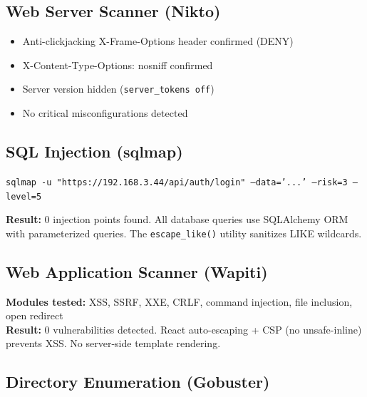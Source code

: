 \documentclass[11pt,a4paper]{article}
\begin{document}
\subsection{Web Server Scanner (Nikto)}

\begin{tcolorbox}[colback=pass!5, colframe=pass, title=\textbf{Web Server Scan --- PASS}]
\begin{itemize}[nosep]
  \item Anti-clickjacking X-Frame-Options header confirmed (DENY)
  \item X-Content-Type-Options: nosniff confirmed
  \item Server version hidden (\texttt{server\_tokens off})
  \item No critical misconfigurations detected
\end{itemize}
\end{tcolorbox}

\subsection{SQL Injection (sqlmap)}

\begin{tcolorbox}[colback=pass!5, colframe=pass, title=\textbf{SQL Injection --- PASS}]
\texttt{sqlmap -u "https://192.168.3.44/api/auth/login" --data='...' --risk=3 --level=5}

\textbf{Result:} 0 injection points found. All database queries use SQLAlchemy ORM with parameterized queries. The \texttt{escape\_like()} utility sanitizes LIKE wildcards.
\end{tcolorbox}

\subsection{Web Application Scanner (Wapiti)}

\begin{tcolorbox}[colback=pass!5, colframe=pass, title=\textbf{Web Application Scan --- PASS}]
\textbf{Modules tested:} XSS, SSRF, XXE, CRLF, command injection, file inclusion, open redirect \\
\textbf{Result:} 0 vulnerabilities detected. React auto-escaping + CSP (no unsafe-inline) prevents XSS. No server-side template rendering.
\end{tcolorbox}

\subsection{Directory Enumeration (Gobuster)}
\end{document}
